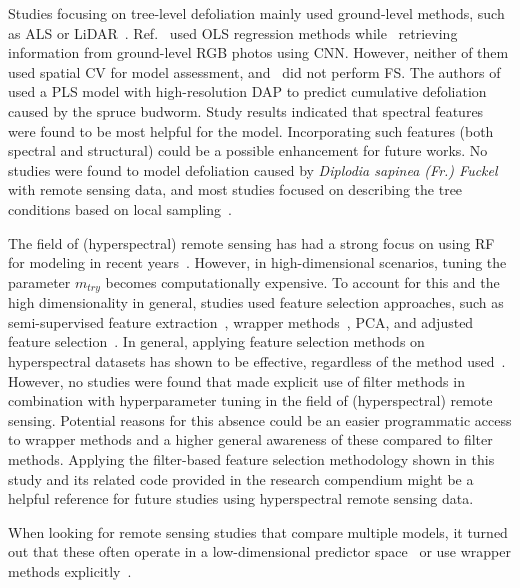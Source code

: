 \documentclass[remotesensing,article,accept,moreauthors,pdftex]{Definitions/mdpi}
\begin{document}
\begin{paracol}{2}
Studies focusing on tree-level defoliation mainly used ground-level methods, such as \ac{ALS} or \ac{LiDAR}~\cite{meng2018, kalin2019}.
Ref.~\cite{meng2018} used \ac{OLS} regression methods while~\cite{kalin2019} retrieving information from ground-level RGB photos using \ac{CNN}.
However, neither of them used spatial \ac{CV} for model assessment, and~\cite{kalin2019} did not perform \ac{FS}.
The authors of \cite{goodbody2018} used a \ac{PLS} model with high-resolution \ac{DAP} to predict cumulative defoliation caused by the spruce budworm.
Study results indicated that spectral features were found to be most helpful for the model.
Incorporating such features (both spectral and structural) could be a possible enhancement for future works.
No studies were found to model defoliation caused by \textit{Diplodia sapinea (Fr.) Fuckel} with remote sensing data, and most studies focused on describing the tree conditions based on local sampling~\cite{hlebarska2018, kaya2019}.

The field of (hyperspectral) remote sensing has had a strong focus on using RF for modeling in recent years~\cite{belgiu2016}.
However, in high-dimensional scenarios, tuning the parameter \texttt{\(m_{try}\)} becomes computationally expensive.
To account for this and the high dimensionality in general, studies used feature selection approaches, such as  semi-supervised feature extraction~\cite{xia2015}, wrapper methods~\cite{fassnacht2014, feng2016, georganos2018}, PCA, and adjusted feature selection~\cite{rochac2016}.
In general, applying feature selection methods on hyperspectral datasets has shown to be effective, regardless of the method used~\cite{pal2010, keller2016}.
However, no studies were found that made explicit use of filter methods in combination with hyperparameter tuning in the field of (hyperspectral) remote sensing.
Potential reasons for this absence could be an easier programmatic access to wrapper methods and a higher general awareness of these compared to filter methods.
Applying the filter-based feature selection methodology shown in this study and its related code provided in the research compendium might be a helpful reference for future studies using hyperspectral remote sensing data.

When looking for remote sensing studies that compare multiple models, it turned out that these often operate in a low-dimensional predictor space~\cite{xu2019} or use wrapper methods explicitly~\cite{georganos2018}.


\end{paracol}
\end{document}
